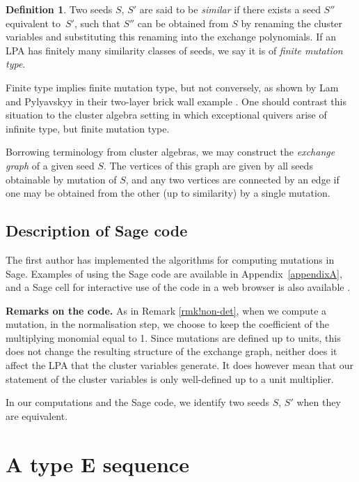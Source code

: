 \documentclass[pdftex]{sigma}
\numberwithin{equation}{section}
\theoremstyle{definition}
\newtheorem{defn}[thm]{Definition}
\begin{document}
\begin{defn}
	Two seeds $S$, $S'$ are said to be \textit{similar} if there exists a seed $S''$ equivalent to~$S'$, such that $S''$ can be obtained from $S$ by renaming the cluster variables and substituting this renaming into the exchange polynomials. If an LPA has finitely many similarity classes of seeds, we say it is of \textit{finite mutation type}.
\end{defn}

Finite type implies finite mutation type, but not conversely, as shown by Lam and Pylyavskyy in their two-layer brick wall example \cite[Section~7.2]{lp}. One should contrast this situation to the cluster algebra setting in which exceptional quivers arise of infinite type, but finite mutation type.

Borrowing terminology from cluster algebras, we may construct the \textit{exchange graph} of a given seed $S$. The vertices of this graph are given by all seeds obtainable by mutation of $S$, and any two vertices are connected by an edge if one may be obtained from the other (up to similarity) by a single mutation.

\subsection{Description of Sage code}

The first author has implemented the algorithms for computing mutations in Sage. Examples of using the Sage code are available in Appendix~\ref{appendixA}, and a Sage cell for interactive use of the code in a web browser is also available \cite{sagecode}.

{\bf Remarks on the code.}
As in Remark \ref{rmk!non-det}, when we compute a mutation, in the normalisation step, we choose to keep the coefficient of the multiplying monomial equal to 1. Since mutations are defined up to units, this does not change the resulting structure of the exchange graph, neither does it affect the LPA that the cluster variables generate. It does however mean that our statement of the cluster variables is only well-defined up to a unit multiplier.

In our computations and the Sage code, we identify two seeds $S$, $S'$ when they are equivalent.

\section[A type E sequence]{A type $\boldsymbol{E}$ sequence}
\end{document}
